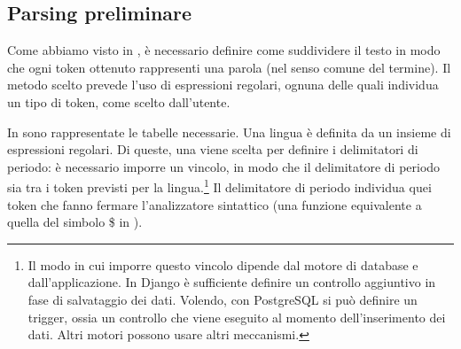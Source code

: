\documentclass[twoside,stylearticle,11pt,filologia,it,article,bibsection]{spinoza}
\begin{document}
\subsection{Parsing preliminare}
\label{sec:parsing}

Come abbiamo visto in , è necessario definire
come suddividere il testo in modo che ogni token ottenuto rappresenti
una parola (nel senso comune del termine). Il metodo scelto prevede
l'uso di espressioni regolari, ognuna delle quali individua un tipo di
token, come scelto dall'utente.


In  sono rappresentate le tabelle necessarie. Una
lingua è definita da un insieme di espressioni regolari. Di queste,
una viene scelta per definire i delimitatori di periodo: è necessario
imporre un vincolo, in modo che il delimitatore di periodo sia tra i
token previsti per la lingua.\footnote{Il modo in cui imporre questo
  vincolo dipende dal motore di database e dall'applicazione. In
  Django è sufficiente definire un controllo aggiuntivo in fase di
  salvataggio dei dati. Volendo, con PostgreSQL si può definire un
  trigger, ossia un controllo che viene eseguito al momento
  dell'inserimento dei dati. Altri motori possono usare altri
  meccanismi.} Il delimitatore di periodo individua quei token che
fanno fermare l'analizzatore sintattico (una funzione equivalente a
quella del simbolo \$ in ).
\end{document}
